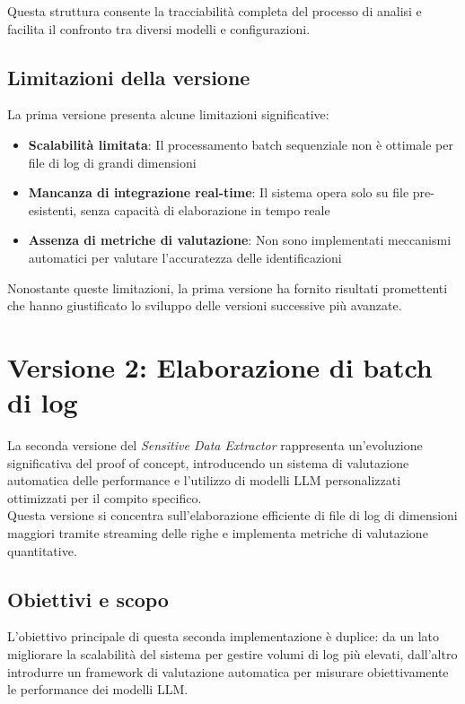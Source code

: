 \documentclass[12pt]{report}
\begin{document}
Questa struttura consente la tracciabilità completa del processo di analisi e facilita il confronto tra diversi modelli e configurazioni.

\subsection{Limitazioni della versione}
\label{subsec:ver1_limitazioni}

La prima versione presenta alcune limitazioni significative:

\begin{itemize}
    \item \textbf{Scalabilità limitata}: Il processamento batch sequenziale non è ottimale per file di log di grandi dimensioni
    \item \textbf{Mancanza di integrazione real-time}: Il sistema opera solo su file pre-esistenti, senza capacità di elaborazione in tempo reale
    \item \textbf{Assenza di metriche di valutazione}: Non sono implementati meccanismi automatici per valutare l'accuratezza delle identificazioni
\end{itemize}

Nonostante queste limitazioni, la prima versione ha fornito risultati promettenti che hanno giustificato lo sviluppo delle versioni successive più avanzate.

\section{Versione 2: Elaborazione di batch di log}
\label{sec:ver2}

La seconda versione del \textit{Sensitive Data Extractor} rappresenta un'evoluzione significativa del proof of concept, introducendo un sistema di valutazione automatica delle performance e l'utilizzo di modelli LLM personalizzati ottimizzati per il compito specifico. \\
Questa versione si concentra sull'elaborazione efficiente di file di log di dimensioni maggiori tramite streaming delle righe e implementa metriche di valutazione quantitative.

\subsection{Obiettivi e scopo}
\label{subsec:ver2_obiettivi}

L'obiettivo principale di questa seconda implementazione è duplice: da un lato migliorare la scalabilità del sistema per gestire volumi di log più elevati, dall'altro introdurre un framework di valutazione automatica per misurare obiettivamente le performance dei modelli LLM.
\end{document}
